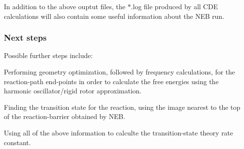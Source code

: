 In addition to the above ouptut files, the $\ast$.log file produced by all C\+DE calculations will also contain some useful information about the N\+EB run.

\subsubsection*{Next steps}

Possible further steps include\+:


\begin{DoxyItemize}
\item Performing geometry optimization, followed by frequency calculations, for the reaction-\/path end-\/points in order to calculate the free energies using the harmonic oscillator/rigid rotor approximation.
\item Finding the transition state for the reaction, using the image nearest to the top of the reaction-\/barrier obtained by N\+EB.
\item Using all of the above information to calculte the transition-\/state theory rate constant. 
\end{DoxyItemize}